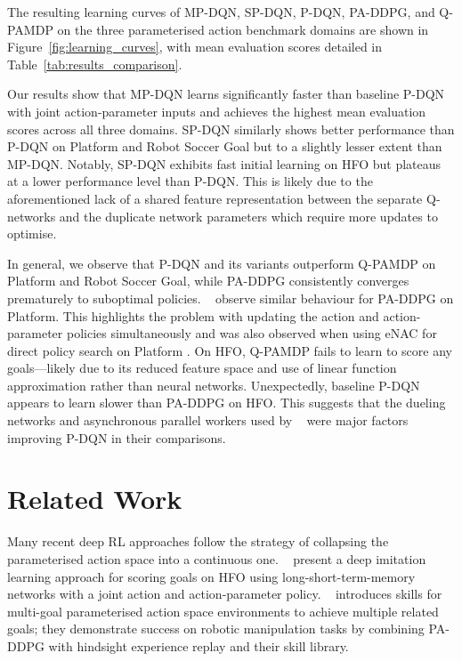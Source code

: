 \documentclass{article}
\def\PDQN*{P\nobreakdash-DQN}
\def\SPDQN*{SP\nobreakdash-DQN}
\def\MPDQN*{MP\nobreakdash-DQN}
\def\QPAMDP*{Q\nobreakdash-PAMDP}
\def\PADDPG*{PA\nobreakdash-DDPG}
\newcommand{\citet}[1]
{\citeauthor{#1}~\shortcite{#1}}
\newcommand{\citep}{\cite}
\begin{document}
The resulting learning curves of \MPDQN*, \SPDQN*, \PDQN*, \PADDPG*, and \QPAMDP* on the three parameterised action benchmark domains are shown in Figure~\ref{fig:learning_curves}, with mean evaluation scores detailed in Table~\ref{tab:results_comparison}.  

Our results show that \MPDQN* learns significantly faster than baseline \PDQN* with joint action-parameter inputs and achieves the highest mean evaluation scores across all three domains. \SPDQN* similarly shows better performance than \PDQN* on Platform and Robot Soccer Goal but to a slightly lesser extent than \MPDQN*. Notably, \SPDQN* exhibits fast initial learning on HFO but plateaus at a lower performance level than \PDQN*. This is likely due to the aforementioned lack of a shared feature representation between the separate Q-networks and the duplicate network parameters which require more updates to optimise.

In general, we observe that \PDQN* and its variants outperform \QPAMDP* on Platform and Robot Soccer Goal, while \PADDPG* consistently converges prematurely to suboptimal policies. \citet{wei2018} observe similar behaviour for \PADDPG* on Platform. This highlights the problem with updating the action and action-parameter policies simultaneously and was also observed when using eNAC for direct policy search on Platform \citep{masson2016}. On HFO, \QPAMDP* fails to learn to score any goals---likely due to its reduced feature space and use of linear function approximation rather than neural networks. Unexpectedly, baseline \PDQN* appears to learn slower than \PADDPG* on HFO. This suggests that the dueling networks and asynchronous parallel workers used by \citet{xiong2018} were major factors improving \PDQN* in their comparisons. 







\section{Related Work}

Many recent deep RL approaches follow the strategy of collapsing the parameterised action space into a continuous one. \citet{hussein2018} present a deep imitation learning approach for scoring goals on HFO using long-short-term-memory networks with a joint action and action-parameter policy. \citet{agarwa2018} introduces skills for multi-goal parameterised action space environments to achieve multiple related goals; they demonstrate success on robotic manipulation tasks by combining \PADDPG* with hindsight experience replay and their skill library.
\end{document}
